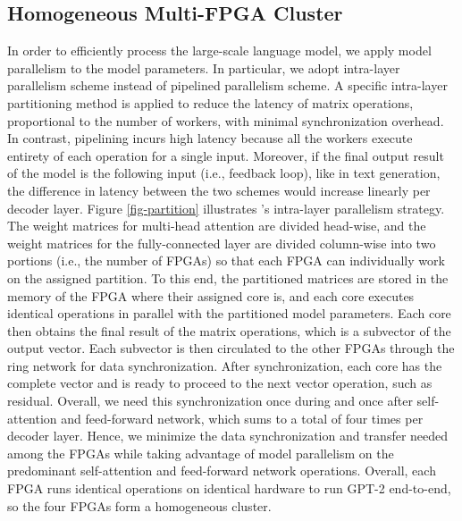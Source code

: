 \subsection{Homogeneous Multi-FPGA Cluster}
\label{architecture_cluster}
In order to efficiently process the large-scale language model, we apply model parallelism to the model parameters. In particular, we adopt intra-layer parallelism scheme\cite{shoeybi2019megatron} instead of pipelined parallelism scheme\cite{tarnawski2020efficient}. A specific intra-layer partitioning method is applied to reduce the latency of matrix operations, proportional to the number of workers, with minimal synchronization overhead. In contrast, pipelining incurs high latency because all the workers execute entirety of each operation for a single input. Moreover, if the final output result of the model is the following input (i.e., feedback loop), like in text generation, the difference in latency between the two schemes would increase linearly per decoder layer. Figure \ref{fig-partition} illustrates \sysname{}'s intra-layer parallelism strategy. The weight matrices for multi-head attention are divided head-wise, and the weight matrices for the fully-connected layer are divided column-wise into two portions (i.e., the number of FPGAs) so that each FPGA can individually work on the assigned partition. 
To this end, the partitioned matrices are stored in the memory of the FPGA where their assigned core is, and each core executes identical operations in parallel with the partitioned model parameters.
Each core then obtains the final result of the matrix operations, which is a subvector of the output vector. Each subvector is then circulated to the other FPGAs through the ring network for data synchronization. After synchronization, each core has the complete vector and is ready to proceed to the next vector operation, such as residual. Overall, we need this synchronization once during and once after self-attention and feed-forward network, which sums to a total of four times per decoder layer.
Hence, we minimize the data synchronization and transfer needed among the FPGAs while taking advantage of model parallelism on the predominant self-attention and feed-forward network operations. Overall, each FPGA runs identical operations on identical hardware to run GPT-2 end-to-end, so the four FPGAs form a homogeneous cluster.


